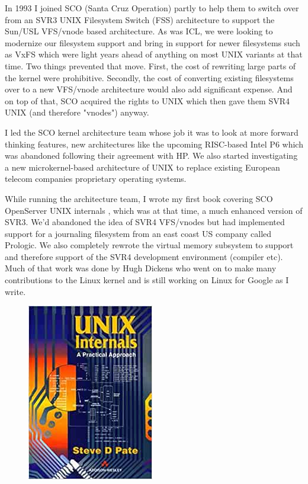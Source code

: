 In 1993 I joined SCO (Santa Cruz Operation) partly to help them to switch over from an SVR3 UNIX Filesystem Switch (FSS) architecture to support the Sun/USL VFS/vnode based architecture. As was ICL, we were looking to modernize our filesystem support and bring in support for newer filesystems such as VxFS which were light years ahead of anything on most UNIX variants at that time. Two things prevented that move. First, the cost of rewriting large parts of the kernel were prohibitive. Secondly, the cost of converting existing filesystems over to a new VFS/vnode architecture would also add significant expense. And on top of that, SCO acquired the rights to UNIX which then gave them SVR4 UNIX (and therefore "vnodes") anyway.

I led the SCO kernel architecture team whose job it was to look at more forward thinking features, new architectures like the upcoming RISC-based Intel P6 which was abandoned following their agreement with HP. We also started investigating a new microkernel-based architecture of UNIX to replace existing European telecom companies proprietary operating systems.

While running the architecture team, I wrote my first book covering SCO OpenServer UNIX internals \cite{pate-unix}, which was at that time, a much enhanced version of SVR3. We’d abandoned the idea of SVR4 VFS/vnodes but had implemented support for a journaling filesystem from an east coast US company called Prologic. We also completely rewrote the virtual memory subsystem to support  and therefore support of the SVR4 development environment (compiler etc). Much of that work was done by Hugh Dickens who went on to make many contributions to the Linux kernel and is still working on Linux for Google as I write.

\begin{figure}
	\centering
	\includegraphics[scale=0.4]{figures/book-1.jpg}
\end{figure}

